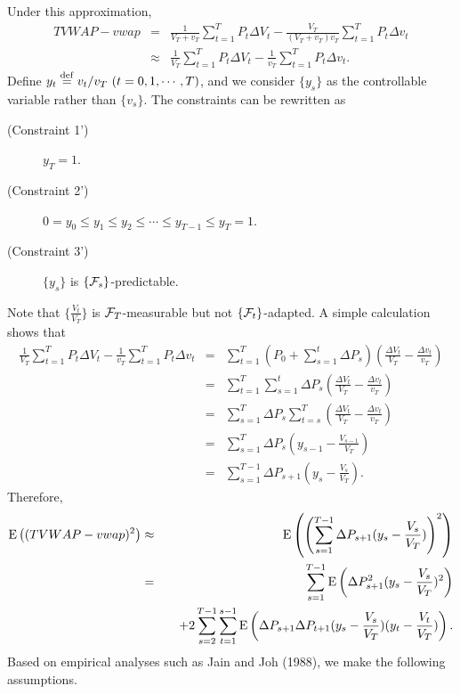Under this approximation,  
\begin{eqnarray*}
  TVWAP - vwap
   & = & \frac{1}{V_T+v_T} \sum_{t=1}^T P_t \Delta V_t - 
\frac{V_T}{(V_T+v_T)v_T}
         \sum_{t=1}^T P_t \Delta v_t \\
   & \approx & \frac{1}{V_T} \sum_{t=1}^T P_t \Delta V_t - \frac{1}{v_T}
         \sum_{t=1}^T P_t \Delta v_t.
\end{eqnarray*}
Define $y_t \stackrel{\mathrm{def}}{=} v_t/v_T\ (t=0,1,\cdots,T)$, and we consider $\{ y_s \}$ as 
the controllable variable rather than $\{ v_s \}$.  The constraints can be 
rewritten as 
\begin{description}
 \item[(Constraint 1')] $y_T=1$.
 \item[(Constraint 2')] $0=y_0 \leq y_1 \leq y_2 \leq \cdots \leq y_{T-1} \leq 
y_T=1$.
 \item[(Constraint 3')] $\{ y_s \}$ is $\{ {\cal F}_s \}$-predictable.
\end{description}
Note that $\displaystyle \{\frac{V_t}{V_T}\}$ is ${\cal F}_T$-measurable but not 
$\{ {\cal F}_t \}$-adapted.
A simple calculation shows that
\begin{eqnarray*}
  \frac{1}{V_T} \sum_{t=1}^T P_t \Delta V_t - \frac{1}{v_T} \sum_{t=1}^T P_t 
\Delta v_t
   & = & \sum_{t=1}^T \left( P_0 + \sum_{s=1}^t \Delta P_s \right)
         \left( \frac{\Delta V_t}{V_T} - \frac{\Delta v_t}{v_T} \right) \\
   & = & \sum_{t=1}^T \sum_{s=1}^t \Delta P_s
         \left( \frac{\Delta V_t}{V_T} - \frac{\Delta v_t}{v_T} \right) \\
   & = & \sum_{s=1}^T \Delta P_s \sum_{t=s}^T
         \left( \frac{\Delta V_t}{V_T} - \frac{\Delta v_t}{v_T} \right) \\
   & = & \sum_{s=1}^T \Delta P_s ( y_{s-1} - \frac{V_{s-1}}{V_T} ) \\
   & = & \sum_{s=1}^{T-1} \Delta P_{s+1} ( y_s - \frac{V_s}{V_T} ).
\end{eqnarray*}
Therefore, 
\begin{eqnarray}
  {\mathrm{E}}\left( (TVWAP-vwap)^2 \right)
   & \approx & {\mathrm{E}}\left( \left( \sum_{s=1}^{T-1} \Delta P_{s+1} (y_s-\frac{V_s}{V_T}) 
\right)^2 \right) \nonumber \\
   & = & \sum_{s=1}^{T-1} {\mathrm{E}}\left( \Delta P_{s+1}^2 (y_s - \frac{V_s}{V_T})^2 \right) 
\nonumber \\ 
   &   & \quad +2 \sum_{s=2}^{T-1} \sum_{t=1}^{s-1}
         {\mathrm{E}}\left( \Delta P_{s+1} \Delta P_{t+1} (y_s-\frac{V_s}{V_T}) (y_t-
\frac{V_t}{V_T}) \right). \label{eq1_d1}
\end{eqnarray}
Based on empirical analyses such as Jain and Joh (1988), we make the following 
assumptions.

